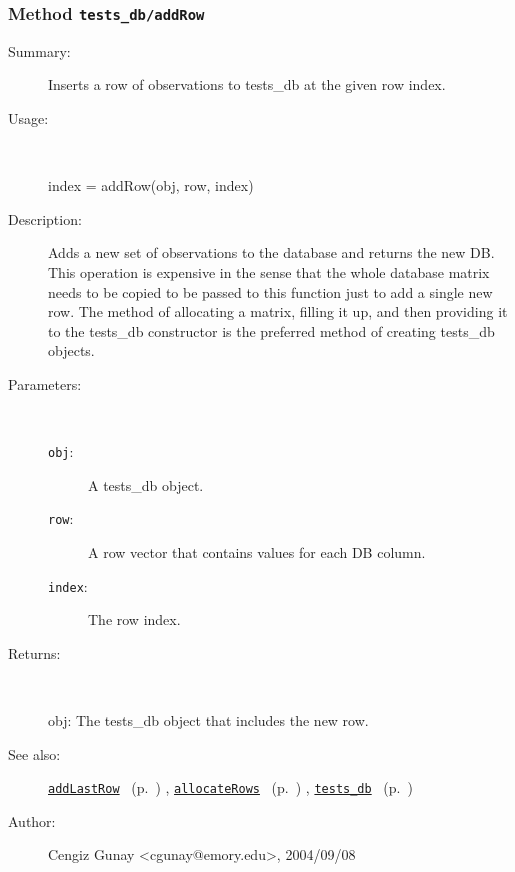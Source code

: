 \subsubsection[Method \texttt{addRow}]{Method \texttt{tests\_db/addRow}}%
%
\label{ref_tests_db__addRow}%
\hypertarget{ref_tests_db__addRow}{}%
\begin{description}
\item[Summary:]Inserts a row of observations to tests\_db at the given row index.
%
\item[Usage:]~%
\begin{lyxcode}%
index = addRow(obj, row, index)
%
\end{lyxcode}%
%
\item[Description:]%
Adds a new set of observations to the database and returns the new DB.
   This operation is expensive in the sense that the whole database matrix
   needs to be copied to be passed to this function just to add a 
   single new row. The method of allocating a matrix, filling it up, and
   then providing it to the tests\_db constructor is the preferred method 
   of creating tests\_db objects.
\item[Parameters:]~
\begin{description}%
\item[\texttt{obj}:]
 A tests\_db object.
\item[\texttt{row}:]
 A row vector that contains values for each DB column.
\item[\texttt{index}:]
 The row index.
\end{description}%
%
\item[Returns:]~

	obj: The tests\_db object that includes the new row.
%
%
\item[See also:]%
\hyperlink{ref_addLastRow}{\texttt{addLastRow}}%
\ (p.~\pageref{ref_addLastRow})%
%
, \hyperlink{ref_allocateRows}{\texttt{allocateRows}}%
\ (p.~\pageref{ref_allocateRows})%
%
, \hyperlink{ref_tests_db}{\texttt{tests\_db}}%
\ (p.~\pageref{ref_tests_db})%
%
%
\item[Author:]%
Cengiz Gunay <cgunay@emory.edu>, 2004/09/08%
\end{description}
\methodline%
